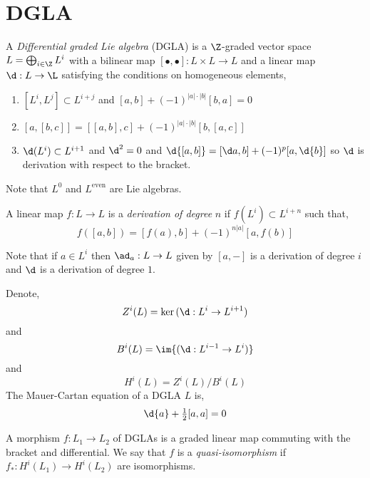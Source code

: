 \documentclass[12pt]{article}
\begin{document}
\section{DGLA}


\begin{defn}
A \textit{Differential graded Lie algebra} (DGLA) is a $\Z$-graded vector space $L = \bigoplus_{i \in \Z} L^i$ with a bilinear map $[\bullet, \bullet] : L \times L \to L$ and a linear map $\d : L \to \L$ satisfying the conditions on homogeneous elements,
\begin{enumerate}
\item $[L^i, L^j] \subset L^{i+j}$ and $[a,b] + (-1)^{|a|\cdot |b|}[b,a] = 0$
\item $[a,[b,c]] = [[a,b], c] + (-1)^{|a|\cdot|b|} [b, [a,c]]$
\item $\d(L^i) \subset L^{i+1}$ and $\d^2 = 0$ and $\d{[a,b]} = [\d a, b] + (-1)^p [a, \d{b}]$ so $\d$ is derivation with respect to the bracket.
\end{enumerate}
\end{defn}

\begin{rmk}
Note that $L^0$ and $L^{\text{even}}$ are Lie algebras.
\end{rmk}

\begin{defn}
A linear map $f : L \to L$ is a \textit{derivation of degree} $n$ if $f(L^i) \subset L^{i+n}$ such that,
\[ f([a,b]) = [f(a), b] + (-1)^{n |a|} [a, f(b)] \]
\end{defn}

\begin{rmk}
Note that if $a \in L^i$ then $\ad_a : L \to L$ given by $[a, -]$ is a derivation of degree $i$ and $\d$ is a derivation of degree $1$.
\end{rmk}

\begin{defn}
Denote,
\[ Z^i(L) = \ker{(\d : L^i \to L^{i+1})} \]
and
\[ B^i(L) = \im{(\d : L^{i-1} \to L^i)} \]
and
\[ H^i(L) = Z^i(L)/B^i(L) \]
The Mauer-Cartan equation of a DGLA $L$ is,
\[ \d{a} + \tfrac{1}{2} [a,a] = 0 \]
\end{defn}

\begin{defn}
A morphism $f : L_1 \to L_2$ of DGLAs is a graded linear map commuting with the bracket and differential. We say that $f$ is a \textit{quasi-isomorphism} if $f_* : H^i(L_1) \to H^i(L_2)$ are isomorphisms.
\end{defn}
\end{document}
